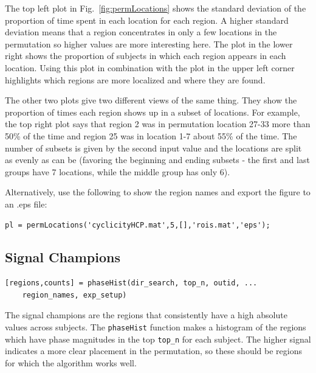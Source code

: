 \documentclass[11pt]{article}
\def\f{Fig.}
\begin{document}
The top left plot in \f~\ref{fig:permLocations} shows the standard deviation of the proportion of time spent in each location for each region. A higher standard deviation means that a region concentrates in only a few locations in the permutation so higher values are more interesting here. The plot in the lower right shows the proportion of subjects in which each region appears in each location. Using this plot in combination with the plot in the upper left corner highlights which regions are more localized and where they are found. 

The other two plots give two different views of the same thing. They show the proportion of times each region shows up in a subset of locations. For example, the top right plot says that region 2 was in permutation location 27-33 more than 50\% of the time and region 25 was in location 1-7 about 55\% of the time. The number of subsets is given by the second input value and the locations are split as evenly as can be (favoring the beginning and ending subsets - the first and last groups have 7 locations, while the middle group has only 6).

Alternatively, use the following to show the region names and export the figure to an .eps file:

\begin{lstlisting}
pl = permLocations('cyclicityHCP.mat',5,[],'rois.mat','eps');
\end{lstlisting}

\subsection{Signal Champions}

\begin{lstlisting}[frame=single]
[regions,counts] = phaseHist(dir_search, top_n, outid, ...
	region_names, exp_setup)
\end{lstlisting}

The signal champions are the regions that consistently have a high absolute values across subjects. The \verb|phaseHist| function makes a histogram of the regions which have phase magnitudes in the top \verb|top_n| for each subject. The higher signal indicates a more clear placement in the permutation, so these should be regions for which the algorithm works well.
\end{document}
